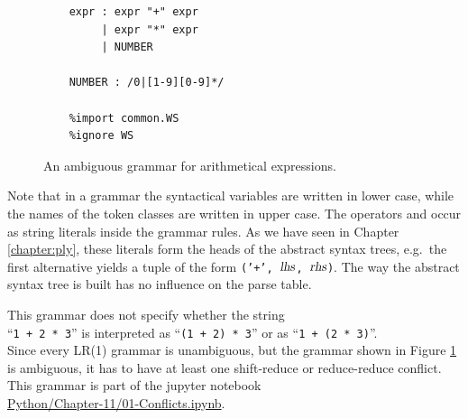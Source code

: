 \begin{figure}[!ht]
\centering
\begin{verbatim}
    expr : expr "+" expr
         | expr "*" expr
         | NUMBER

    NUMBER : /0|[1-9][0-9]*/

    %import common.WS
    %ignore WS
\end{verbatim}
\vspace*{-0.3cm}
\caption{An ambiguous grammar for arithmetical expressions.}
\label{fig:Conflicts.ipynb}
\end{figure}
\FloatBarrier

\noindent
Note that in a  grammar the syntactical variables are written in lower case, while the names of
the token classes are written in upper case.  The operators \squoted{+} and \squoted{*} occur as string literals
inside the grammar rules.  As we have seen in Chapter \ref{chapter:ply}, these literals form the heads of the
abstract syntax trees, e.g.~the first alternative yields a tuple of the form \texttt{('+', $\textsl{lhs}$,
$\textsl{rhs}$)}.  The way the abstract syntax tree is built has no influence on the parse table.

This grammar does not specify whether the string
\\[0.2cm]
\hspace*{1.3cm}
``\texttt{1 + 2 * 3}'' \quad is interpreted as \quad  ``\texttt{(1 + 2) * 3}'' \quad or as \quad ``\texttt{1 +
  (2 * 3)}''.
\\[0.2cm]
Since every LR(1) grammar is unambiguous, but the grammar shown in Figure \ref{fig:Conflicts.ipynb} is
ambiguous, it has to have at least one shift-reduce or reduce-reduce conflict.  This grammar is part of the
jupyter notebook
\\[0.2cm]
\hspace*{1.3cm}
\href{https://github.com/karlstroetmann/Formal-Languages/tree/master/Python/Chapter-11/01-Conflicts.ipynb}{Python/Chapter-11/01-Conflicts.ipynb}.
\\[0.2cm]

